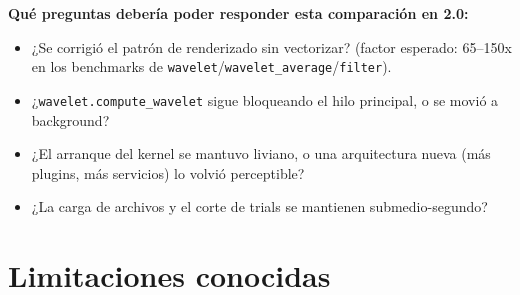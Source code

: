 \documentclass[11pt,a4paper]{article}
\begin{document}
\textbf{Qué preguntas debería poder responder esta comparación en 2.0:}
\begin{itemize}[nosep]
  \item ¿Se corrigió el patrón de renderizado sin vectorizar? (factor esperado: 65--150x en los benchmarks de
        \texttt{wavelet}/\texttt{wavelet\_\allowbreak average}/\texttt{filter}).
  \item ¿\texttt{wavelet.compute\_\allowbreak wavelet} sigue bloqueando el hilo principal, o se movió a
        background?
  \item ¿El arranque del kernel se mantuvo liviano, o una arquitectura nueva (más plugins, más servicios) lo
        volvió perceptible?
  \item ¿La carga de archivos y el corte de trials se mantienen submedio-segundo?
\end{itemize}

\section{Limitaciones conocidas}
\label{sec:limitaciones}
\end{document}
